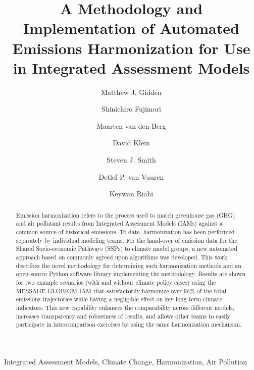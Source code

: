 \begin{frontmatter}

\title{A Methodology and Implementation of Automated Emissions Harmonization for Use in Integrated Assessment Models}

\author[iiasa]{Matthew J. Gidden}

\author[nies]{Shinichiro Fujimori}
\author[pbl]{Maarten van den Berg}
\author[pik]{David Klein}
\author[pnnl]{Steven J. Smith}
\author[pbl]{Detlef P. van Vuuren}
\author[iiasa]{Keywan Riahi}

\address[iiasa]{International Institute for Applied Systems Analysis,
  Schlossplatz 1, A-2361 Laxenburg, Austria}
\address[nies]{Center for Social and Environmental Systems Research, National Institute for Environmental Studies, 16-2 Onogawa, Tsukuba, Ibaraki 305-8506, Japan}
\address[pbl]{PBL Netherlands Environmental Assessment Agency, Postbus 30314, 2500 GH The Hague, Netherlands}
\address[pik]{Potsdam Institute for Climate Impact Research (PIK), Member of the Leibniz Association, P.O. Box 60 12 03, D-14412 Potsdam, Germany}
\address[pnnl]{Joint Global Change Research Institute, 5825 University Research Court, Suite 3500, College Park, MD 20740}

\begin{abstract}
Emission harmonization refers to the process used to match greenhouse gas (GHG)
and air pollutant results from Integrated Assessment Models (IAMs) against a
common source of historical emissions. To date, harmonization has been performed
separately by individual modeling teams. For the hand-over of emission data for
the Shared Socio-economic Pathways (SSPs) to climate model groups, a new
automated approach based on commonly agreed upon algorithms was developed. This
work describes the novel methodology for determining such harmonization methods
and an open-source Python software library implementing the methodology. Results
are shown for two example scenarios (with and without climate policy cases)
using the MESSAGE-GLOBIOM IAM that satisfactorily harmonize over 96\% of the
total emissions trajectories while having a negligible effect on key long-term
climate indicators. This new capability enhances the comparability across
different models, increases transparency and robustness of results, and allows
other teams to easily participate in intercomparison exercises by using the same
harmonization mechansim.
\end{abstract}

\begin{keyword}
Integrated Assessment Models, Climate Change, Harmonization, Air Pollution 
\end{keyword}

\end{frontmatter}

\linenumbers
